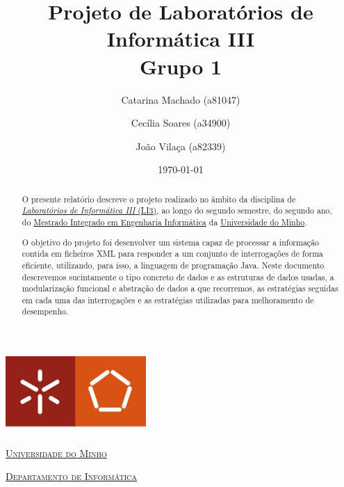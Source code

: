 \documentclass[a4paper]{article}
\begin{document}
\title{Projeto de Laboratórios de Informática III\\Grupo 1}
\author{Catarina Machado (a81047) \and Cecília Soares (a34900) \and João Vilaça (a82339)}
\date{\today}

\begin{titlepage}

  \thispagestyle{empty}
  \begin{center}
  \begin{minipage}{0.75\linewidth}
      \centering
      \includegraphics[width=0.4\textwidth]{eng.jpeg}\par\vspace{1cm}
      \vspace{1.5cm}
      \href{https://www.uminho.pt/PT}{\scshape\LARGE Universidade do Minho} \par
      \vspace{1cm}
      \href{https://www.di.uminho.pt/}{\scshape\Large Departamento de Informática} \par
      \vspace{1.5cm}

  \maketitle

  \end{minipage}
  \end{center}
  \clearpage

 \end{titlepage}


\begin{abstract}
O presente relatório descreve o projeto realizado no âmbito da disciplina de
\href{http://miei.di.uminho.pt/plano_estudos.html#laborat_rios_de_inform_tica_iii}
{\emph {Laboratórios de Informática III} (LI3)}, ao longo do segundo semestre,
do segundo ano, do \href{http://miei.di.uminho.pt}{Mestrado Integrado em Engenharia Informática}
da \href{https://www.uminho.pt}{Universidade do Minho}.

O objetivo do projeto foi desenvolver um sistema capaz de processar a informação
contida em ficheiros XML para responder a um conjunto de interrogações de forma
eficiente, utilizando, para isso, a linguagem de programação Java. Neste documento
descrevemos sucintamente o tipo concreto de dados e as estruturas de dados usadas,
a modularização funcional e abstração de dados a que recorremos, as estratégias seguidas
em cada uma das interrogações e as estratégias utilizadas para melhoramento de desempenho.

\end{abstract}
\pagebreak
\end{document}
